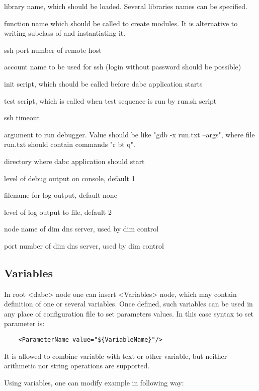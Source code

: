 \bdes
\item[lib] library name, which should be loaded. Several libraries names can be specified.
\item[func] function name which should be called to create modules. 
It is alternative to writing subclass of  and instantiating it.
\item[port] ssh port number of remote host
\item[user] account name to be used for ssh (login without password should be possible)
\item[init] init script, which should be called before dabc application starts
\item[test] test script, which is called when test sequence is run by run.sh script
\item[timeout] ssh timeout 
\item[debugger] argument to run debugger. Value should be like "gdb -x run.txt --args", where file run.txt should contain commands "r bt q".
\item[workdir] directory where dabc application should start
\item[debuglevel] level of debug output on console, default 1
\item[logfile] filename for log output, default none  
\item[loglevel] level of log output to file, default 2 
\item[DIM\_DNS\_NODE] node name of dim dns server, used by dim control 
\item[DIM\_DNS\_PORT] port number of dim dns server, used by dim control 
\edes


\subsection{Variables}

In root <dabc> node one can insert <Variables> node, which may contain 
definition of one or several variables. Once defined, 
such variables can be used in any place of configuration file to set parameters values.
In this case syntax to set parameter is:

\begin{verbatim}
    <ParameterName value="${VariableName}"/>
\end{verbatim}

It is allowed to combine variable with text or other variable, 
but neither arithmetic nor string operations are supported. 

Using variables, one can modify example in following way:

